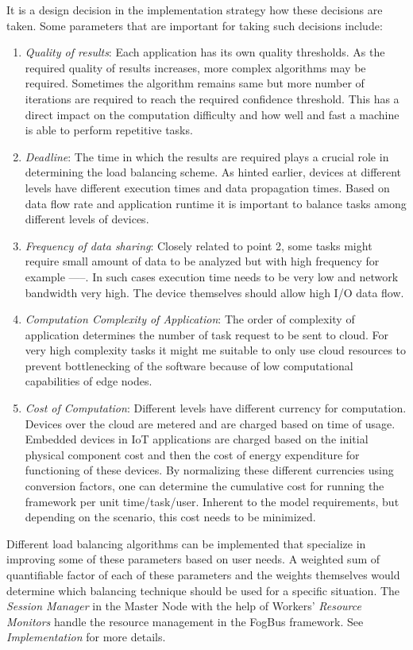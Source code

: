 \documentclass[10pt,journal,compsoc]{IEEEtran}
\begin{document}
It is a design decision in the implementation strategy how these decisions are taken. Some parameters that are important for taking such decisions include:
\begin{enumerate}
\item \textit{Quality of results}: Each application has its own quality thresholds. As the required quality of results increases, more complex algorithms may be required. Sometimes the algorithm remains same but more number of iterations are required to reach the required confidence threshold. This has a direct impact on the computation difficulty and how well and fast a machine is able to perform repetitive tasks.
\item \textit{Deadline}: The time in which the results are required plays a crucial role in determining the load balancing scheme. As hinted earlier, devices at different levels have different execution times and data propagation times. Based on data flow rate and application runtime it is important to balance tasks among different levels of devices.
\item \textit{Frequency of data sharing}: Closely related to point 2, some tasks might require small amount of data to be analyzed but with high frequency for example -----. In such cases execution time needs to be very low and network bandwidth very high. The device themselves should allow high I/O data flow.
\item \textit{Computation Complexity of Application}: The order of complexity of application determines the number of task request to be sent to cloud. For very high complexity tasks it might me suitable to only use cloud resources to prevent bottlenecking of the software because of low computational capabilities of edge nodes.
\item \textit{Cost of Computation}: Different levels have different currency for computation. Devices over the cloud are metered and are charged based on time of usage. Embedded devices in IoT applications are charged based on the initial physical component cost and then the cost of energy expenditure for functioning of these devices. By normalizing these different currencies using conversion factors, one can determine the cumulative cost for running the framework per unit time/task/user. Inherent to the model requirements, but depending on the scenario, this cost needs to be minimized. 
\end{enumerate}
Different load balancing algorithms can be implemented that specialize in improving some of these parameters based on user needs. A weighted sum of quantifiable factor of each of these parameters and the weights themselves would determine which balancing technique should be used for a specific situation. The \textit{Session Manager} in the Master Node with the help of Workers' \textit{Resource Monitors} handle the resource management in the FogBus framework. See \textit{Implementation} for more details.
\end{document}
